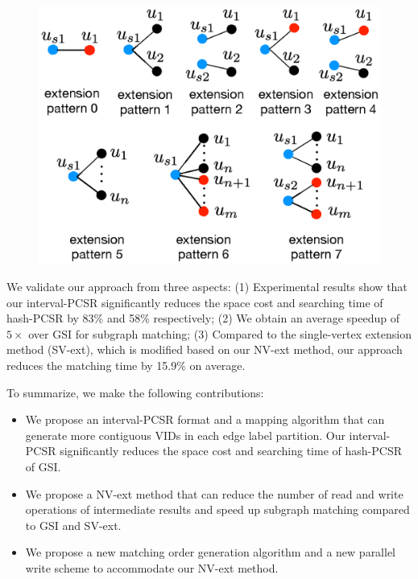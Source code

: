 \begin{figure}
\centering
\includegraphics[width=0.9\columnwidth]{./figure/extpattern.eps}
\caption{}	
\label{fig:extpattern}
\end{figure}

 We validate our approach from three aspects: (1) Experimental results show that our interval-PCSR significantly reduces the space cost and searching time of hash-PCSR by 83\% and 58\% respectively; (2) We obtain an average speedup of $5\times$ over GSI for subgraph matching; (3) Compared to the single-vertex extension method (SV-ext), which is modified based on our NV-ext method, our approach reduces the matching time by 15.9\% on average.

 To summarize, we make the following contributions:
 \begin{itemize}
  \item We propose an interval-PCSR format and a mapping algorithm that can generate more contiguous VIDs in each edge label partition. Our interval-PCSR significantly reduces the space cost and searching time of hash-PCSR of GSI.
  \item We propose a NV-ext method that can reduce the number of read and write operations of intermediate results and speed up subgraph matching compared to GSI and SV-ext.
  \item We propose a new matching order generation algorithm and a new parallel write scheme to accommodate our NV-ext method.
\end{itemize}
